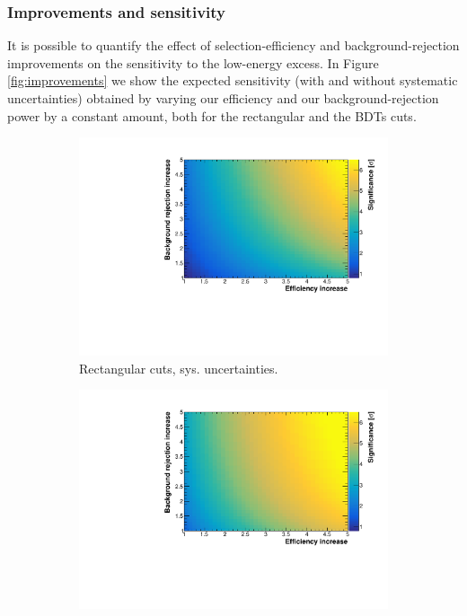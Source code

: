 \subsubsection{Improvements and sensitivity}
It is possible to quantify the effect of selection-efficiency and background-rejection improvements on the sensitivity to the low-energy excess. In Figure \ref{fig:improvements} we show the expected sensitivity (with and without systematic uncertainties) obtained by varying our efficiency and our background-rejection power by a constant amount, both for the rectangular and the BDTs cuts. 

\begin{figure}[htbp]
  \begin{center}
     \begin{subfigure}{0.48\textwidth}
      \includegraphics[width=\linewidth]{figures/cuts_2d_sys.pdf}
      \caption{Rectangular cuts, sys. uncertainties.}  
    \end{subfigure}\hfill
    \begin{subfigure}{0.48\textwidth}
      \includegraphics[width=\linewidth]{figures/bdt_2d_sys.pdf}

\end{subfigure}
\end{center}
\end{figure}
